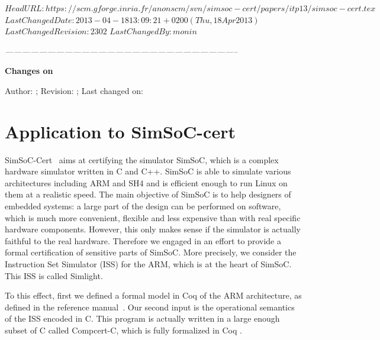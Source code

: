 \svnidlong
{$HeadURL: https://scm.gforge.inria.fr/anonscm/svn/simsoc-cert/papers/itp13/simsoc-cert.tex $}
{$LastChangedDate: 2013-04-18 13:09:21 +0200 (Thu, 18 Apr 2013) $}
{$LastChangedRevision: 2302 $}
{$LastChangedBy: monin $}


\begin{thoughts}
\itshape
\hfil -----------------------------------------------------------------------------------\par
\hfil \textbf{Changes on \currfilename}

Author: \svnfileauthor; Revision: \svnfilerev; Last changed on: \svnfiledate
\end{thoughts}


\section{Application to SimSoC-cert}
\label{sec:simsoccert}

SimSoC-Cert~\cite{rapido11,cpp11} aims at certifying the simulator SimSoC, 
which is a complex hardware simulator written in C and C++.
SimSoC is able to simulate various architectures including ARM and SH4 and is 
efficient enough to run Linux on them at a realistic speed.
The main objective of SimSoC is to help designers of embedded systems:
a large part of the design can be performed on software,
which is much more convenient, flexible and less expensive
than with real specific hardware components.
However, 
this only makes sense if the simulator is actually faithful to the real
hardware.
Therefore we engaged in an effort to provide a formal certification
of sensitive parts of SimSoC.
More precisely, we consider the Instruction Set Simulator (ISS)
for the ARM, which is at the heart of SimSoC.
This ISS is called Simlight.

To this effect, first we defined a formal model in Coq of the ARM architecture,
as defined in the reference manual~\cite{arm6refman}.
Our second input is the operational semantics of the ISS encoded in C. 
This program is actually written in a large enough subset of C
called Compcert-C,
which is fully formalized in Coq \cite{Leroy-Compcert-CACM}.

